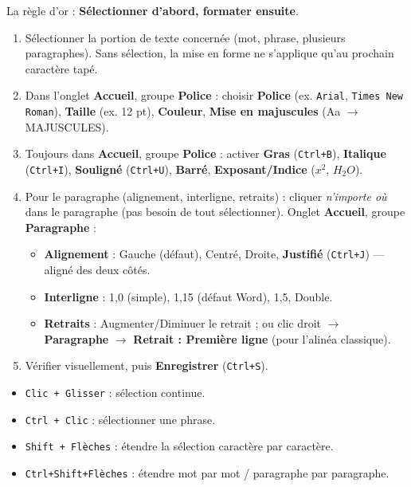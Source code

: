 \documentclass[11pt]{article}
\newcommand{\cle}[1]{{\popxbold\color{popdark}#1}}
\begin{document}
\begin{methode}
La règle d'or : \textbf{Sélectionner d'abord, formater ensuite}.
\begin{enumerate}
  \item \cle{Sélectionner} la portion de texte concernée (mot, phrase, plusieurs paragraphes). Sans sélection, la mise en forme ne s'applique qu'au prochain caractère tapé.
  \item Dans l'onglet \textbf{Accueil}, groupe \textbf{Police} : choisir \textbf{Police} (ex. \texttt{Arial}, \texttt{Times New Roman}), \textbf{Taille} (ex. 12 pt), \textbf{Couleur}, \textbf{Mise en majuscules} (Aa $\rightarrow$ MAJUSCULES).
  \item Toujours dans \textbf{Accueil}, groupe \textbf{Police} : activer \textbf{Gras} (\texttt{Ctrl+B}), \textbf{Italique} (\texttt{Ctrl+I}), \textbf{Souligné} (\texttt{Ctrl+U}), \textbf{Barré}, \textbf{Exposant/Indice} ($x^2$, $H_2O$).
  \item Pour le \cle{paragraphe} (alignement, interligne, retraits) : cliquer \emph{n'importe où} dans le paragraphe (pas besoin de tout sélectionner). Onglet \textbf{Accueil}, groupe \textbf{Paragraphe} :
  \begin{itemize}
    \item \textbf{Alignement} : Gauche (défaut), Centré, Droite, \textbf{Justifié} (\texttt{Ctrl+J}) — aligné des deux côtés.
    \item \textbf{Interligne} : 1,0 (simple), 1,15 (défaut Word), 1,5, Double.
    \item \textbf{Retraits} : Augmenter/Diminuer le retrait ; ou clic droit $\rightarrow$ \textbf{Paragraphe} $\rightarrow$ \textbf{Retrait : Première ligne} (pour l'alinéa classique).
  \end{itemize}
  \item Vérifier visuellement, puis \textbf{Enregistrer} (\texttt{Ctrl+S}).
\end{enumerate}
\end{methode}

\begin{exemplebox}
\begin{itemize}
  \item \texttt{Clic + Glisser} : sélection continue.
  \item \texttt{Ctrl + Clic} : sélectionner une phrase.
  \item \texttt{Shift + Flèches} : étendre la sélection caractère par caractère.
  \item \texttt{Ctrl+Shift+Flèches} : étendre mot par mot / paragraphe par paragraphe.
\end{itemize}
\end{exemplebox}
\end{document}
